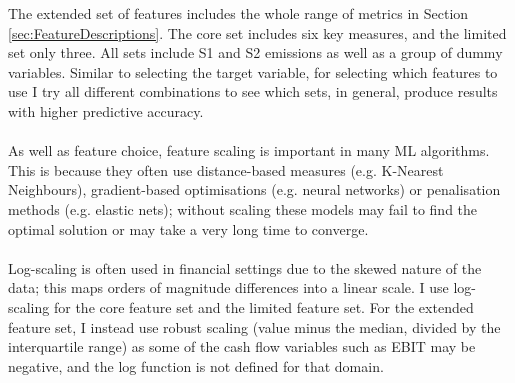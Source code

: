 \documentclass[12pt,twoside]{report}
\begin{document}
\begin{table}[htbp]
    \centering
    \caption{Feature sets used in the analysis}
    \label{tab:FeatureBuckets}
\end{table}

The extended set of features includes the whole range of metrics in Section \ref{sec:FeatureDescriptions}. The core set includes six key measures, and the limited set only three. All sets include S1 and S2 emissions as well as a group of dummy variables. Similar to selecting the target variable, for selecting which features to use I try all different combinations to see which sets, in general, produce results with higher predictive accuracy.
\\\\
As well as feature choice, feature scaling is important in many ML algorithms. This is because they often use distance-based measures (e.g. K-Nearest Neighbours), gradient-based optimisations (e.g. neural networks) or penalisation methods (e.g. elastic nets); without scaling these models may fail to find the optimal solution or may take a very long time to converge.
\\\\
Log-scaling is often used in financial settings due to the skewed nature of the data; this maps orders of magnitude differences into a linear scale. I use log-scaling for the core feature set and the limited feature set. For the extended feature set, I instead use robust scaling (value minus the median, divided by the interquartile range) as some of the cash flow variables such as EBIT may be negative, and the log function is not defined for that domain. 
\end{document}
